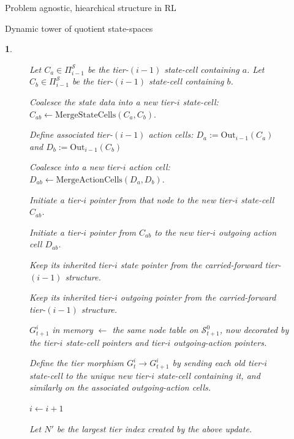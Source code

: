 \documentclass[11pt]{article}
\newtheorem{ermark}[subsubsection]{}
\begin{document}
\begin{section}{Problem agnostic, hiearchical structure in RL}
\begin{subsection}{Dynamic tower of quotient state-spaces}
\begin{ermark}
\begin{figure}[!h]
\begin{algorithm}[H]
\begin{algorithmic}[1]
            \State Let $C_a\in\Pi_{i-1}^{\mathcal S}$ be the tier-$(i-1)$ state-cell containing $a$.
            \State Let $C_b\in\Pi_{i-1}^{\mathcal S}$ be the tier-$(i-1)$ state-cell containing $b$.

                \State Coalesce the state data into a new tier-$i$ state-cell:
                $
                C_{ab}\gets \mathrm{MergeStateCells}(C_a,C_b).
                $

                \State Define associated tier-$(i-1)$ action cells: $D_a:=\mathrm{Out}_{i-1}(C_a)$ and $D_b:=\mathrm{Out}_{i-1}(C_b)$

                \State Coalesce into a new tier-$i$ action cell:
                $
                D_{ab}\gets \mathrm{MergeActionCells}(D_a,D_b).
                $

                    \State Initiate a tier-$i$ pointer from that node to the new tier-$i$ state-cell $C_{ab}$.
                \EndFor

                \State Initiate a tier-$i$ pointer from $C_{ab}$ to the new tier-$i$ outgoing action cell $D_{ab}$.
            \EndIf
        \EndFor

                \State Keep its inherited tier-$i$ state pointer from the carried-forward tier-$(i-1)$ structure.
            \EndIf

                \State Keep its inherited tier-$i$ outgoing pointer from the carried-forward tier-$(i-1)$ structure.
            \EndIf
        \EndFor

        \State $G_{t+1}^i$ in memory $\gets$ the same node table on $\mathcal{S}_{t+1}^0$, now decorated by the tier-$i$ state-cell pointers and tier-$i$ outgoing-action pointers.

        \State Define the tier morphism
        $
        G_t^i \longrightarrow G_{t+1}^i
        $
        by sending each old tier-$i$ state-cell to the unique new tier-$i$ state-cell containing it, and similarly on the associated outgoing-action cells.

        \State $i \gets i+1$

    \EndWhile

    \State Let $N'$ be the largest tier index created by the above update.


\end{algorithmic}
\end{algorithm}
\end{figure}
\end{ermark}
\end{subsection}
\end{section}
\end{document}
